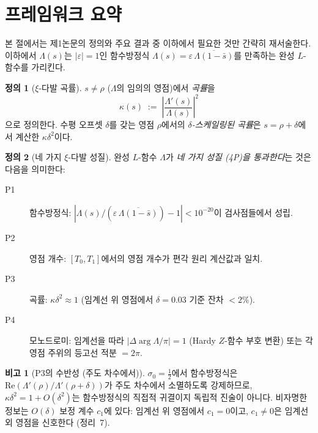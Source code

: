 \documentclass[11pt, a4paper]{article}
\theoremstyle{plain}
\theoremstyle{definition}
\newtheorem{definition}{정의}[section]
\newtheorem{remark}{비고}[section]
\begin{document}
\section{프레임워크 요약}
\label{sec:recap}

본 절에서는 제1논문의 정의와 주요 결과 중 이하에서 필요한 것만 간략히
재서술한다. 이하에서 $\Lambda(s)$는 $|\varepsilon|=1$인
함수방정식 $\Lambda(s) = \varepsilon\,\overline{\Lambda(1-\bar{s})}$를
만족하는 완성 $L$-함수를 가리킨다.

\begin{definition}[$\xi$-다발 곡률]
  $s\neq\rho$ ($\Lambda$의 임의의 영점)에서 \emph{곡률}을
  \[
    \kappa(s) \;:=\; \left|\frac{\Lambda'(s)}{\Lambda(s)}\right|^{2}
  \]
  으로 정의한다. 수평 오프셋 $\delta$를 갖는 영점 $\rho$에서의
  \emph{$\delta$-스케일링된 곡률}은 $s = \rho+\delta$에서
  계산한 $\kappa\delta^{2}$이다.
\end{definition}

\begin{definition}[네 가지 $\xi$-다발 성질]
  완성 $L$-함수 $\Lambda$가 \emph{네 가지 성질 (4P)을 통과한다}는 것은
  다음을 의미한다:
  \begin{description}
    \item[P1] 함수방정식:
      $|\Lambda(s)/(\varepsilon\,\overline{\Lambda(1-\bar{s})})-1|<10^{-20}$이
      검사점들에서 성립.
    \item[P2] 영점 개수: $[T_{0}, T_{1}]$에서의 영점 개수가
      편각 원리 계산값과 일치.
    \item[P3] 곡률: $\kappa\delta^{2}\approx 1$
      (임계선 위 영점에서 $\delta=0.03$ 기준 잔차 $<2\%$).
    \item[P4] 모노드로미: 임계선을 따라
      $|{}\Delta\!\arg\Lambda\!/\pi|=1$ (Hardy $Z$-함수 부호 변환)
      또는 각 영점 주위의 등고선 적분 $=2\pi$.
  \end{description}
\end{definition}

\begin{remark}[P3의 수반성 (주도 차수에서)]
\label{rem:tautology}
  $\sigma_{0}=\tfrac{1}{2}$에서 함수방정식은
  $\mathrm{Re}(\Lambda'(\rho)/\Lambda'(\rho+\delta))$가
  주도 차수에서 소멸하도록 강제하므로,
  $\kappa\delta^{2}=1+O(\delta^{2})$는
  함수방정식의 직접적 귀결이지 독립적 진술이 아니다.
  비자명한 정보는 $O(\delta)$ 보정 계수 $c_{1}$에 있다:
  임계선 위 영점에서 $c_{1}=0$이고,
  $c_{1}\neq 0$은 임계선 외 영점을 신호한다 (정리~7).
\end{remark}
\end{document}
